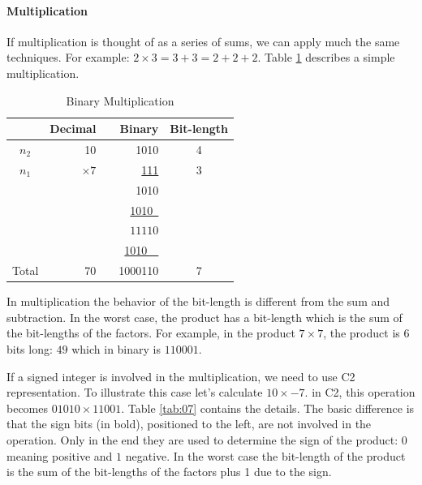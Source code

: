 \documentclass[12pt]{article}
\begin{document}
\paragraph{Multiplication}
If multiplication is thought of as a series of sums, we can apply much the same
techniques. For example: $2 \times 3 = 3 + 3 = 2 + 2 + 2$. Table \ref{tab:06}
describes a simple multiplication.

\begin{table}[ht]
  \centering
  \caption{Binary Multiplication}
  \begin{tabular}{crrrc}
  \hline
	& Decimal & & Binary & Bit-length \\
  \hline      
  $n_2$ & 10	& & 1010 & 4\\
  $n_1$ & \underline{$\times 7$} & & \underline{111} & 3 \\
  & & & 1010  & \\
  & & & \underline{1010\ } & \\
  & & & $11110$ & \\
  & & & \underline{1010\ \ } & \\
  Total& 70 & & 1000110 & 7\\
  \hline
      \end{tabular}
  \label{tab:06}
\end{table}

In multiplication the behavior of the bit-length is different from the sum and
subtraction. In the worst case, the product has a bit-length which is the sum of
the bit-lengths of the factors. For example, in the product $7\times7$, the
product is 6 bits long: $49$ which in binary is $110001$.

If a signed integer is involved in the multiplication, we need to use C2
representation. To illustrate this case let's calculate $10\times-7$. in C2,
this operation becomes $01010\times11001$. Table \ref{tab:07} contains the
details. The basic difference is that the sign bits (in bold), positioned to
the left, are not involved in the operation. Only in the end they are used to
determine the sign of the product: $0$ meaning positive and $1$ negative. In
the worst case the bit-length of the product is the sum of the bit-lengths of
the factors plus 1 due to the sign.
\end{document}
